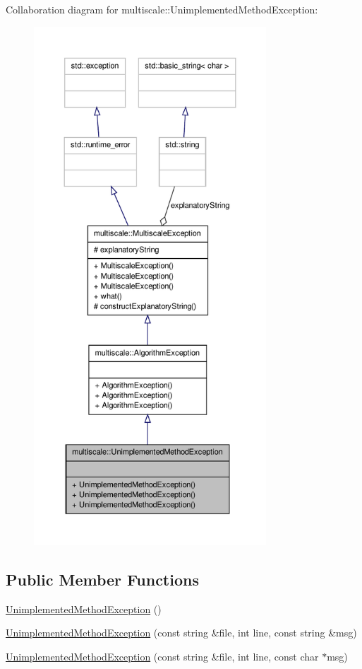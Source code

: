 \-Collaboration diagram for multiscale\-:\-:\-Unimplemented\-Method\-Exception\-:
\nopagebreak
\begin{figure}[H]
\begin{center}
\leavevmode
\includegraphics[height=550pt]{classmultiscale_1_1UnimplementedMethodException__coll__graph}
\end{center}
\end{figure}
\subsection*{\-Public \-Member \-Functions}
\begin{DoxyCompactItemize}
\item 
\hyperlink{classmultiscale_1_1UnimplementedMethodException_aa2a92f12574928b5cfdc1a77d09080fe}{\-Unimplemented\-Method\-Exception} ()
\item 
\hyperlink{classmultiscale_1_1UnimplementedMethodException_af3e41ba96ee1376dece07e2f875cbc11}{\-Unimplemented\-Method\-Exception} (const string \&file, int line, const string \&msg)
\item 
\hyperlink{classmultiscale_1_1UnimplementedMethodException_aff17b782e719904081a27badd18740b2}{\-Unimplemented\-Method\-Exception} (const string \&file, int line, const char $\ast$msg)
\end{DoxyCompactItemize}


